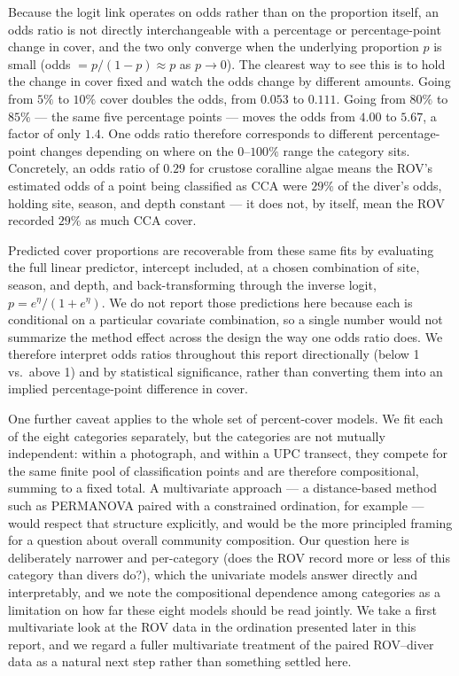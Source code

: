 \documentclass[11pt]{article}
\begin{document}
Because the logit link operates on odds rather than on the proportion itself,
an odds ratio is not directly interchangeable with a percentage or
percentage-point change in cover, and the two only converge when the
underlying proportion $p$ is small (odds $=p/(1-p) \approx p$ as $p \to 0$).
The clearest way to see this is to hold the change in cover fixed and watch
the odds change by different amounts.
Going from $5\%$ to $10\%$ cover doubles the odds, from $0.053$ to $0.111$.
Going from $80\%$ to $85\%$ --- the same five percentage points --- moves the
odds from $4.00$ to $5.67$, a factor of only $1.4$.
One odds ratio therefore corresponds to different percentage-point changes
depending on where on the $0$--$100\%$ range the category sits.
Concretely, an odds ratio of $0.29$ for crustose coralline algae means the
ROV's estimated odds of a point being classified as CCA were $29\%$ of
the diver's odds, holding site, season, and depth constant --- it does not, by
itself, mean the ROV recorded $29\%$ as much CCA cover.

Predicted cover proportions are recoverable from these same fits by
evaluating the full linear predictor, intercept included, at a chosen
combination of site, season, and depth, and back-transforming through the
inverse logit, $p = e^{\eta}/(1 + e^{\eta})$.
We do not report those predictions here because each is conditional on a
particular covariate combination, so a single number would not summarize the
method effect across the design the way one odds ratio does.
We therefore interpret odds ratios throughout this report directionally
(below 1 vs.\ above 1) and by statistical significance, rather than converting
them into an implied percentage-point difference in cover.

One further caveat applies to the whole set of percent-cover models.
We fit each of the eight categories separately, but the categories are not
mutually independent: within a photograph, and within a UPC transect, they
compete for the same finite pool of classification points and are therefore
compositional, summing to a fixed total.
A multivariate approach --- a distance-based method such as PERMANOVA paired
with a constrained ordination, for example --- would respect that structure
explicitly, and would be the more principled framing for a question about
overall community composition.
Our question here is deliberately narrower and per-category (does the ROV
record more or less of this category than divers do?), which the
univariate models answer directly and interpretably, and we note the
compositional dependence among categories as a limitation on how far these
eight models should be read jointly.
We take a first multivariate look at the ROV data in the ordination presented
later in this report, and we regard a fuller multivariate treatment of the
paired ROV--diver data as a natural next step rather than something settled
here.
\end{document}

